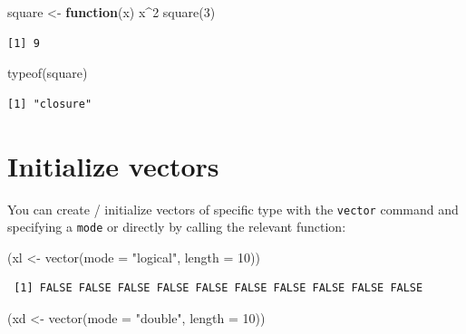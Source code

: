 \documentclass[
]{book}
\newenvironment{Shaded}{\begin{snugshade}}{\end{snugshade}}
\newcommand{\AttributeTok}[1]{\textcolor[rgb]{0.77,0.63,0.00}{#1}}
\newcommand{\ControlFlowTok}[1]{\textcolor[rgb]{0.13,0.29,0.53}{\textbf{#1}}}
\newcommand{\DecValTok}[1]{\textcolor[rgb]{0.00,0.00,0.81}{#1}}
\newcommand{\FunctionTok}[1]{\textcolor[rgb]{0.00,0.00,0.00}{#1}}
\newcommand{\NormalTok}[1]{#1}
\newcommand{\OtherTok}[1]{\textcolor[rgb]{0.56,0.35,0.01}{#1}}
\newcommand{\SpecialCharTok}[1]{\textcolor[rgb]{0.00,0.00,0.00}{#1}}
\newcommand{\StringTok}[1]{\textcolor[rgb]{0.31,0.60,0.02}{#1}}
\begin{document}
\begin{Shaded}
\begin{Highlighting}[]
\NormalTok{square }\OtherTok{\textless{}{-}} \ControlFlowTok{function}\NormalTok{(x) x}\SpecialCharTok{\^{}}\DecValTok{2}
\FunctionTok{square}\NormalTok{(}\DecValTok{3}\NormalTok{)}
\end{Highlighting}
\end{Shaded}

\begin{verbatim}
[1] 9
\end{verbatim}

\begin{Shaded}
\begin{Highlighting}[]
\FunctionTok{typeof}\NormalTok{(square)}
\end{Highlighting}
\end{Shaded}

\begin{verbatim}
[1] "closure"
\end{verbatim}

\hypertarget{initialize-vectors}{%
\section{Initialize vectors}\label{initialize-vectors}}

You can create / initialize vectors of specific type with the \texttt{vector} command and specifying a \texttt{mode} or directly by calling the relevant function:

\begin{Shaded}
\begin{Highlighting}[]
\NormalTok{(xl }\OtherTok{\textless{}{-}} \FunctionTok{vector}\NormalTok{(}\AttributeTok{mode =} \StringTok{"logical"}\NormalTok{, }\AttributeTok{length =} \DecValTok{10}\NormalTok{))}
\end{Highlighting}
\end{Shaded}

\begin{verbatim}
 [1] FALSE FALSE FALSE FALSE FALSE FALSE FALSE FALSE FALSE FALSE
\end{verbatim}

\begin{Shaded}
\begin{Highlighting}[]
\NormalTok{(xd }\OtherTok{\textless{}{-}} \FunctionTok{vector}\NormalTok{(}\AttributeTok{mode =} \StringTok{"double"}\NormalTok{, }\AttributeTok{length =} \DecValTok{10}\NormalTok{))}
\end{Highlighting}
\end{Shaded}
\end{document}
